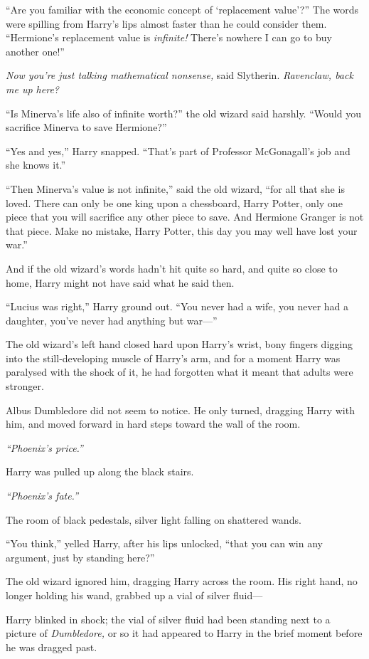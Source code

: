 ``Are you familiar with the economic concept of `replacement value'?''
The words were spilling from Harry's lips almost faster than he could
consider them. ``Hermione's replacement value is \emph{infinite!}
There's nowhere I can go to buy another one!''

\emph{Now you're just talking mathematical nonsense,} said Slytherin.
\emph{Ravenclaw, back me up here?}

``Is Minerva's life also of infinite worth?'' the old wizard said
harshly. ``Would you sacrifice Minerva to save Hermione?''

``Yes and yes,'' Harry snapped. ``That's part of Professor McGonagall's
job and she knows it.''

``Then Minerva's value is not infinite,'' said the old wizard, ``for all
that she is loved. There can only be one king upon a chessboard, Harry
Potter, only one piece that you will sacrifice any other piece to save.
And Hermione Granger is not that piece. Make no mistake, Harry Potter,
this day you may well have lost your war.''

And if the old wizard's words hadn't hit quite so hard, and quite so
close to home, Harry might not have said what he said then.

``Lucius was right,'' Harry ground out. ``You never had a wife, you
never had a daughter, you've never had anything but war---''

The old wizard's left hand closed hard upon Harry's wrist, bony fingers
digging into the still-developing muscle of Harry's arm, and for a
moment Harry was paralysed with the shock of it, he had forgotten what
it meant that adults were stronger.

Albus Dumbledore did not seem to notice. He only turned, dragging Harry
with him, and moved forward in hard steps toward the wall of the room.

\emph{``Phoenix's price.''}

Harry was pulled up along the black stairs.

\emph{``Phoenix's fate.''}

The room of black pedestals, silver light falling on shattered wands.

``You think,'' yelled Harry, after his lips unlocked, ``that you can win
any argument, just by standing here?''

The old wizard ignored him, dragging Harry across the room. His right
hand, no longer holding his wand, grabbed up a vial of silver fluid---

Harry blinked in shock; the vial of silver fluid had been standing next
to a picture of \emph{Dumbledore,} or so it had appeared to Harry in the
brief moment before he was dragged past.

